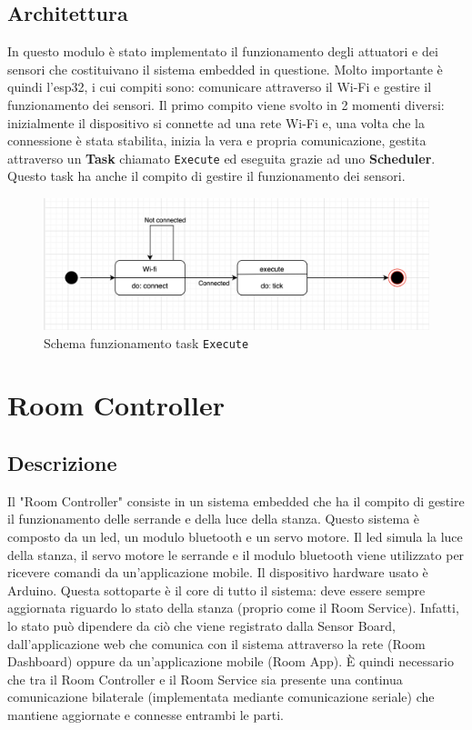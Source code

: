 \documentclass[12pt]{article}
\def\code#1{\texttt{#1}}
\begin{document}
\subsection{Architettura}
In questo modulo è stato implementato il funzionamento degli attuatori e dei sensori che costituivano il sistema embedded in questione. Molto importante è quindi l'esp32, i cui compiti sono: comunicare attraverso il Wi-Fi e gestire il funzionamento dei sensori. Il primo compito viene svolto in 2 momenti diversi: inizialmente il dispositivo si connette ad una rete Wi-Fi e, una volta che la connessione è stata stabilita, inizia la vera e propria comunicazione, gestita attraverso un \textbf{Task} chiamato \code{Execute} ed eseguita grazie ad uno \textbf{Scheduler}. Questo task ha anche il compito di gestire il funzionamento dei sensori.\newline
\begin{figure}[H]
    \includegraphics[width=17cm]{esp-schema.png}
    \centering
    \caption{Schema funzionamento task \code{Execute}}
    \centering
\end{figure}
\newpage


\section{Room Controller}

\subsection{Descrizione}
Il "Room Controller" consiste in un sistema embedded che ha il compito di gestire il funzionamento delle serrande e della luce della stanza.\newline
Questo sistema è composto da un led, un modulo bluetooth e un servo motore. Il led simula la luce della stanza, il servo motore le serrande e il modulo bluetooth viene utilizzato per ricevere comandi da un'applicazione mobile. Il dispositivo hardware usato è Arduino.\newline
Questa sottoparte è il core di tutto il sistema: deve essere sempre aggiornata riguardo lo stato della stanza (proprio come il Room Service). Infatti, lo stato può dipendere da ciò che viene registrato dalla Sensor Board, dall’applicazione web che comunica con il sistema attraverso la rete (Room Dashboard) oppure da un'applicazione mobile (Room App). È quindi necessario che tra il Room Controller e il Room Service sia presente una continua comunicazione bilaterale (implementata mediante comunicazione seriale) che mantiene aggiornate e connesse entrambi le parti.
\end{document}
